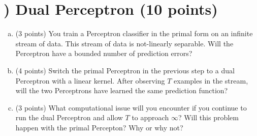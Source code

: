 \documentclass[11pt]{article}
\newcounter{QuestionCounter}
\newcounter{SubQuestionCounter}[QuestionCounter]
\newcommand{\newquestion}{\stepcounter{QuestionCounter}\setcounter{SubQuestionCounter}{1}\newpage}
\begin{document}
\section*{) Dual Perceptron (10 points)} 
\begin{enumerate}[(a)]
\item (3 points) You train a Perceptron classifier in the primal form on an infinite stream of data. This stream of data is not-linearly separable. Will the Perceptron have a bounded number of prediction errors?

\begin{answertext}{5cm}{}
    
\end{answertext} 

\item (4 points) Switch the primal Perceptron in the previous step to a dual Perceptron with a linear kernel. After observing $T$ examples in the stream, will the two Perceptrons have learned the same prediction function?

\begin{answertext}{5cm}{}
    
\end{answertext} 

\item (3 points) What computational issue will you encounter if you continue to run the dual Perceptron and allow $T$ to approach $\infty$? Will this problem happen with the primal Percepton? Why or why not?

\begin{answertext}{5.5cm}{}
    
\end{answertext} 


\end{enumerate}

\newquestion
\end{document}
